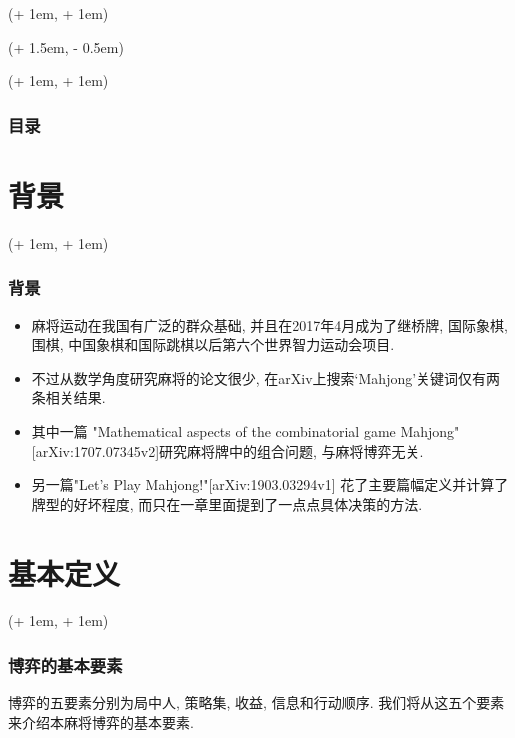\documentclass[xcolor=dvipsnames]{ctexbeamer}
\title{\TITLE}
\author{\AUTHOR}
\date{\tdyear\dateseparator\tdmonth\dateseparator\tdday\hspace{1em}\tdtime}
\institute{\INSTITUTE}
\newcommand{\FrameTextCrono}[1]{
    \begin{textblock*}{\paperwidth}(\textwidth + 1em, \textheight + 1em)
        #1
    \end{textblock*}
}
\newcommand{\FrameTextResetCrono}[1]{
    \begin{textblock*}{\paperwidth}(\textwidth + 1.5em, \textheight - 0.5em)
        #1
    \end{textblock*}
}
\newcommand{\ResetCronoBox}{\resetcrono{\fbox{reset}}}
\let\oldframe\frame
\let\oldendframe\endframe
\renewenvironment{frame}
    {\oldframe\FrameTextCrono{\small\color{blue}{\crono}}}
    {\oldendframe}
\let\oldtitlepage\titlepage
\renewcommand{\titlepage}{\oldtitlepage\FrameTextResetCrono{\ResetCronoBox}}
\begin{document}

    \begin{frame}
        \initclock
        \titlepage
    \end{frame}


    \begin{frame}
        \frametitle{目录}
        \tableofcontents
    \end{frame}


    \section{背景}

    \begin{frame}
        \frametitle{背景}
        \begin{itemize}
            \item 麻将运动在我国有广泛的群众基础, 并且在2017年4月成为了继桥牌,
                国际象棋, 围棋, 中国象棋和国际跳棋以后第六个世界智力运动会项目.
            \item 不过从数学角度研究麻将的论文很少,
                在arXiv上搜索`Mahjong'关键词仅有两条相关结果.
            \item 其中一篇
                "Mathematical aspects of the combinatorial game Mahjong"
                [arXiv:1707.07345v2]研究麻将牌中的组合问题,
                与麻将博弈无关.
            \item 另一篇"Let's Play Mahjong!"[arXiv:1903.03294v1]
                花了主要篇幅定义并计算了牌型的好坏程度,
                而只在一章里面提到了一点点具体决策的方法.
        \end{itemize}
    \end{frame}

    \section{基本定义}

    \begin{frame}
        \frametitle{博弈的基本要素}
        博弈的五要素分别为局中人, 策略集, 收益, 信息和行动顺序.
        我们将从这五个要素来介绍本麻将博弈的基本要素.
    \end{frame}
\end{document}
